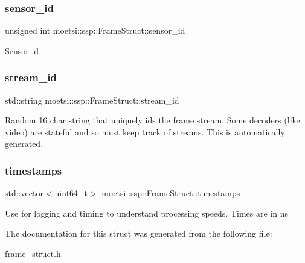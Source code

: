 \subsubsection{\texorpdfstring{sensor\+\_\+id}{sensor\_id}}
{\footnotesize\ttfamily unsigned int moetsi\+::ssp\+::\+Frame\+Struct\+::sensor\+\_\+id}

Sensor id \mbox{\label{structmoetsi_1_1ssp_1_1FrameStruct_a14a7976abfb26a9ca42e17555f8b1a8c}} 
\subsubsection{\texorpdfstring{stream\+\_\+id}{stream\_id}}
{\footnotesize\ttfamily std\+::string moetsi\+::ssp\+::\+Frame\+Struct\+::stream\+\_\+id}

Random 16 char string that uniquely ids the frame stream. Some decoders (like video) are stateful and so must keep track of streams. This is automatically generated. \mbox{\label{structmoetsi_1_1ssp_1_1FrameStruct_a8509ad9c47a69d44dc572e5500973fda}} 
\subsubsection{\texorpdfstring{timestamps}{timestamps}}
{\footnotesize\ttfamily std\+::vector$<$uint64\+\_\+t$>$ moetsi\+::ssp\+::\+Frame\+Struct\+::timestamps}

Use for logging and timing to understand processing speeds. Times are in ns 

The documentation for this struct was generated from the following file\+:\begin{DoxyCompactItemize}
\item 
\hyperlink{frame__struct_8h}{frame\+\_\+struct.\+h}\end{DoxyCompactItemize}
